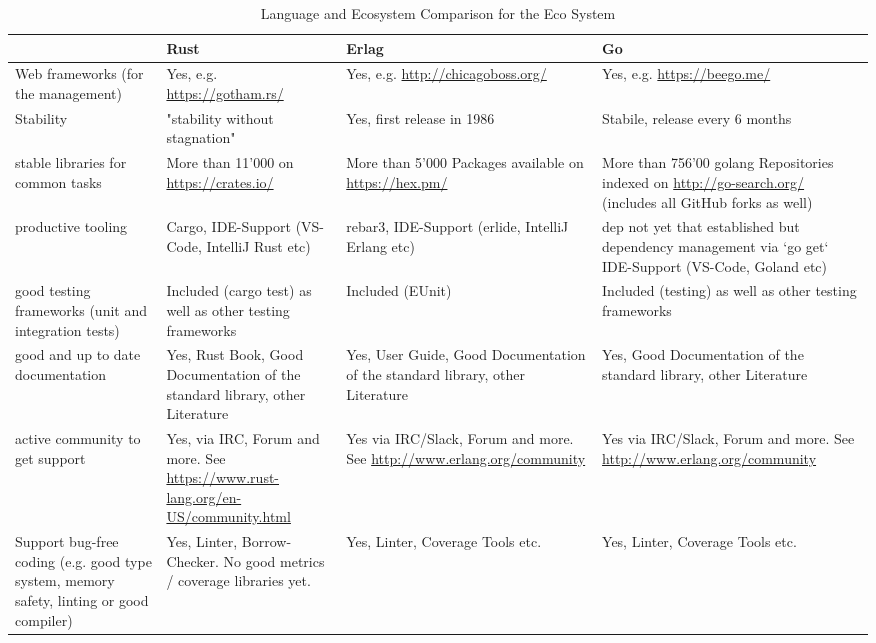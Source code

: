 \begin{table}[h]
	\centering
	\caption{Language and Ecosystem Comparison for the Eco System}
	\label{language-comparison-eco-system}
	\begin{tabu}{X|X X X}
		\hline
		& Rust
		& Erlag
		& Go
		\\ \hline

		Web frameworks (for the management)
		& Yes, e.g. \url{https://gotham.rs/}
		& Yes, e.g. \url{http://chicagoboss.org/}
		& Yes, e.g. \url{https://beego.me/}
		\\
		
		Stability
		& "stability without stagnation" \cite{rust-blog-stability}
		& Yes, first release in 1986 \cite{erlang-org}
		& Stabile, release every 6 months \cite{go-github-release-cycle}
		\\
		
		stable libraries for common tasks
		& More than 11'000 on \url{https://crates.io/}
		& More than 5'000 Packages available on \url{https://hex.pm/}
		& More than 756'00 golang Repositories indexed on \url{http://go-search.org/} (includes all GitHub forks as well)
		\\
		
		productive tooling
		& Cargo, IDE-Support (VS-Code, IntelliJ Rust etc)
		& rebar3, IDE-Support (erlide, IntelliJ Erlang etc)
		& dep not yet that established but dependency management via `go get` IDE-Support (VS-Code, Goland etc)
		\\
		
		good testing frameworks (unit and integration tests)
		& Included (cargo test) as well as other testing frameworks
		& Included (EUnit)
		& Included (testing) as well as other testing frameworks
		\\
		
		good and up to date documentation
		& Yes, Rust Book, Good Documentation of the standard library, other Literature
		& Yes, User Guide, Good Documentation of the standard library, other Literature
		& Yes, Good Documentation of the standard library, other Literature
		\\
		
		active community to get support
		& Yes, via IRC, Forum and more. See \url{https://www.rust-lang.org/en-US/community.html}
		& Yes via IRC/Slack, Forum and more. See \url{http://www.erlang.org/community}
		& Yes via IRC/Slack, Forum and more. See \url{http://www.erlang.org/community}
		\\
		
		Support bug-free coding (e.g. good type system, memory safety, linting or good compiler)
		& Yes, Linter, Borrow-Checker. No good metrics / coverage libraries yet.
		& Yes, Linter, Coverage Tools etc.
		& Yes, Linter, Coverage Tools etc.
	\end{tabu}
\end{table}

